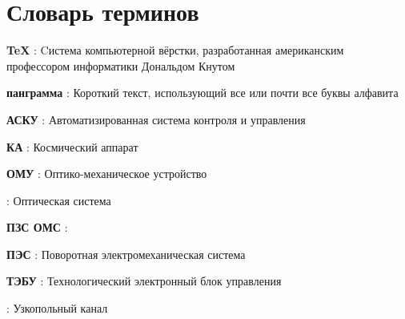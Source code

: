 \chapter*{Словарь терминов}             %

\textbf{TeX} : Cистема компьютерной вёрстки, разработанная американским профессором информатики Дональдом Кнутом

\textbf{панграмма} : Короткий текст, использующий все или почти все буквы алфавита

\textbf{АСКУ} : Автоматизированная система контроля и управления

\textbf {КА} : Космический аппарат

\textbf {ОМУ} : Оптико-механическое  устройство

 : Оптическая система

\textbf {ПЗС ОМС} : 

\textbf {ПЭС} : Поворотная электромеханическая система

\textbf {ТЭБУ} : Технологический электронный блок управления 

 : Узкопольный канал